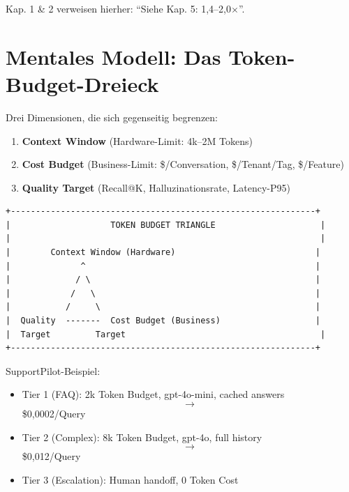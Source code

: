 Kap. 1 \& 2 verweisen hierher: ``Siehe Kap. 5: 1,4--2,0$\times$''.

\section{Mentales Modell: Das Token-Budget-Dreieck}
\label{sec:mental_model}


Drei Dimensionen, die sich gegenseitig begrenzen:
\begin{enumerate}[leftmargin=*]
  \item \textbf{Context Window} (Hardware-Limit: 4k--2M Tokens)
  \item \textbf{Cost Budget} (Business-Limit: \$/Conversation, \$/Tenant/Tag, \$/Feature)
  \item \textbf{Quality Target} (Recall@K, Halluzinationsrate, Latency-P95)
\end{enumerate}

\begin{verbatim}
+-------------------------------------------------------------+
|                    TOKEN BUDGET TRIANGLE                     |
|                                                              |
|        Context Window (Hardware)                            |
|              ^                                              |
|             / \                                             |
|            /   \                                            |
|           /     \                                           |
|  Quality  -------  Cost Budget (Business)                   |
|  Target         Target                                       |
+-------------------------------------------------------------+
\end{verbatim}

SupportPilot-Beispiel:
\begin{itemize}[leftmargin=*]
  \item Tier 1 (FAQ): 2k Token Budget, gpt-4o-mini, cached answers $$\to$$ \$0,0002/Query
  \item Tier 2 (Complex): 8k Token Budget, gpt-4o, full history $$\to$$ \$0,012/Query
  \item Tier 3 (Escalation): Human handoff, 0 Token Cost
\end{itemize}

